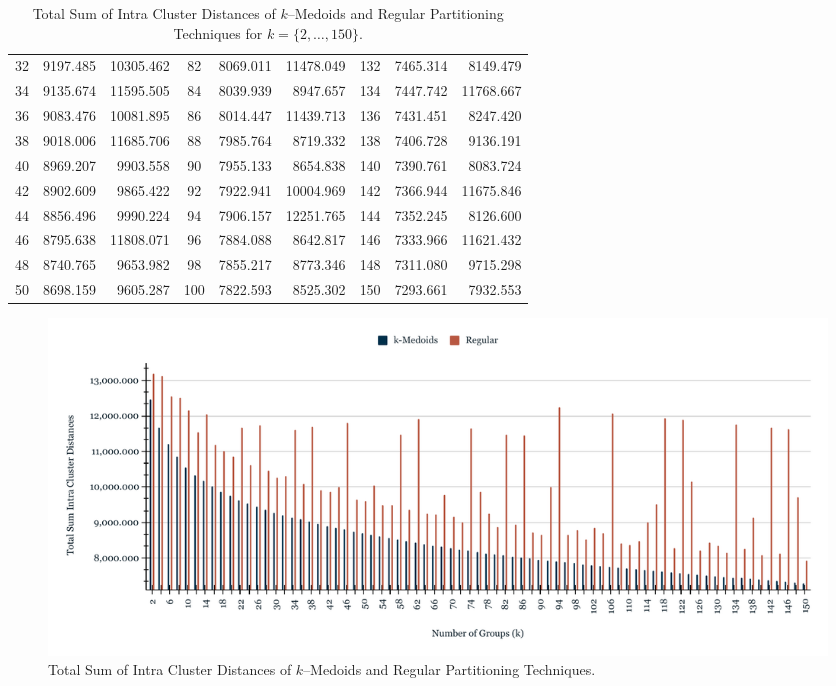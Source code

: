 \begin{table}[h]
\begin{tabular}{|c|r|r|c|r|r|c|r|r|}
		32 &  9197.485 & 10305.462 &  82 & 8069.011 & 11478.049 & 132 & 7465.314 &  8149.479 \\
		34 &  9135.674 & 11595.505 &  84 & 8039.939 &  8947.657 & 134 & 7447.742 & 11768.667 \\
		36 &  9083.476 & 10081.895 &  86 & 8014.447 & 11439.713 & 136 & 7431.451 &  8247.420 \\
		38 &  9018.006 & 11685.706 &  88 & 7985.764 &  8719.332 & 138 & 7406.728 &  9136.191 \\
		40 &  8969.207 &  9903.558 &  90 & 7955.133 &  8654.838 & 140 & 7390.761 &  8083.724 \\
		42 &  8902.609 &  9865.422 &  92 & 7922.941 & 10004.969 & 142 & 7366.944 & 11675.846 \\
		44 &  8856.496 &  9990.224 &  94 & 7906.157 & 12251.765 & 144 & 7352.245 &  8126.600 \\
		46 &  8795.638 & 11808.071 &  96 & 7884.088 &  8642.817 & 146 & 7333.966 & 11621.432 \\
		48 &  8740.765 &  9653.982 &  98 & 7855.217 &  8773.346 & 148 & 7311.080 &  9715.298 \\
		50 &  8698.159 &  9605.287 & 100 & 7822.593 &  8525.302 & 150 & 7293.661 &  7932.553 \\ \hline
		
	\end{tabular}
	\caption{Total Sum of Intra Cluster Distances of $k$--Medoids and Regular Partitioning Techniques for $k = \{2, \ldots, 150\}$.}
	\label{Table:TotalSumRegularkMedoids}
\end{table}

\begin{figure}[h]
	\centering
	\includegraphics[scale=0.45]{../Figures/Scaled-TotalSum-RegularKmedoids}
	\caption{Total Sum of Intra Cluster Distances of $k$--Medoids and Regular Partitioning Techniques.}
	\label{Fig:TotalSum-RegularKmedoids}
\end{figure}

